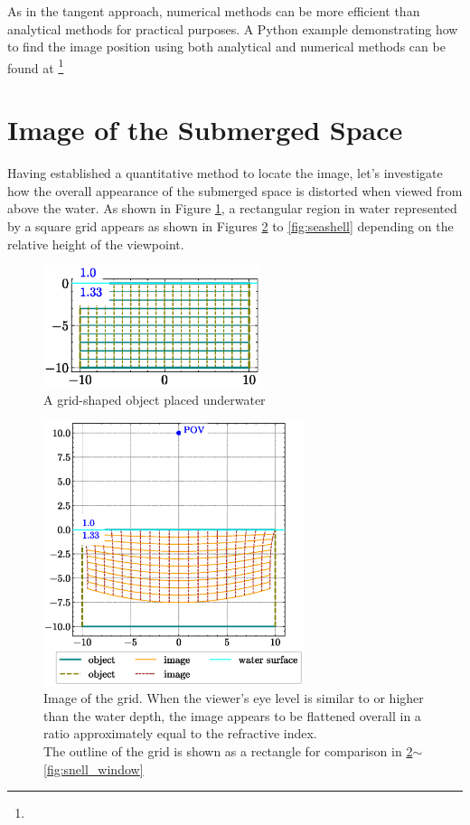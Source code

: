 \documentclass[twocolumn]{article}
\begin{document}
As in the tangent approach, numerical methods can be more efficient than analytical methods for practical purposes. A Python example demonstrating how to find the image position using both analytical and numerical methods can be found at 
\href{https://github.com/mingshey/python_projects/blob/main/Refraction_Image.ipynb}%
{}\footnote{}

\section{Image of the Submerged Space}

Having established a quantitative method to locate the image, let's investigate how the overall appearance of the submerged space is distorted when viewed from above the water. As shown in Figure \ref{fig:grid_underwater}, a rectangular region in water represented by a square grid appears as shown in Figures \ref{fig:image_underwater} to \ref{fig:seashell} depending on the relative height of the viewpoint.

\begin{figure}
	\centering
	\includegraphics[width=2.5in]{figs/grid_underwater.eps}
	\caption{A grid-shaped object placed underwater}
	\label{fig:grid_underwater}
\end{figure}

\begin{figure}[!t]
	\centering
	\includegraphics[width=3in]{figs/image_underwater1.eps}
	\caption{Image of the grid. When the viewer's eye level is similar to or higher than the water depth, the image appears to be flattened overall in a ratio approximately equal to the refractive index.\\
	The outline of the grid is shown as a rectangle for comparison in \ref{fig:image_underwater}$\sim$\ref{fig:snell_window}}
	\label{fig:image_underwater}
\end{figure}
\end{document}
